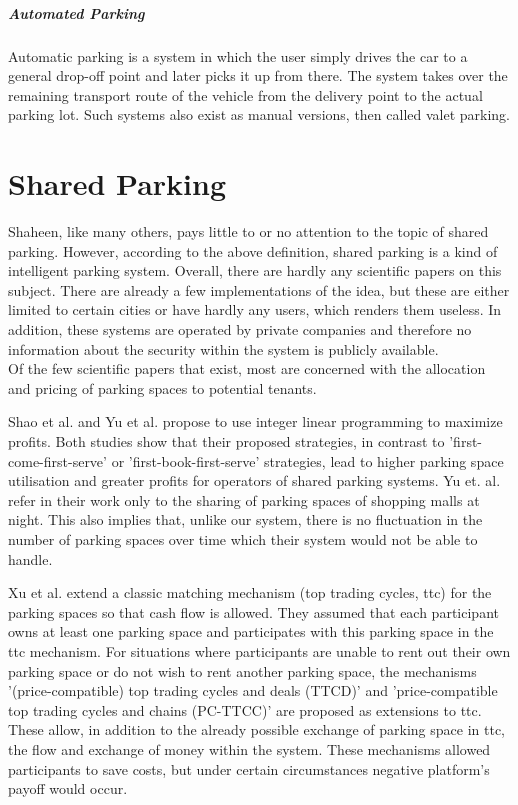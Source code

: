 \subparagraph{Automated Parking}
Automatic parking is a system in which the user simply drives the car to a general drop-off point and later picks it up from there. The system takes over the remaining transport route of the vehicle from the delivery point to the actual parking lot. Such systems also exist as manual versions, then called valet parking.

\section{Shared Parking}
Shaheen, like many others, pays little to or no attention to the topic of shared parking. However, according to the above definition, shared parking is a kind of intelligent parking system. Overall, there are hardly any scientific papers on this subject. There are already a few implementations of the idea, but these are either limited to certain cities or have hardly any users, which renders them useless. In addition, these systems are operated by private companies and therefore no information about the security within the system is publicly available.\\

Of the few scientific papers that exist, most are concerned with the allocation and pricing of parking spaces to potential tenants.

Shao et al. \cite{shao2016simple} and Yu et al. \cite{yu2018optimal} propose to use integer linear programming to maximize profits. Both studies show that their proposed strategies, in contrast to 'first-come-first-serve' or 'first-book-first-serve' strategies, lead to higher parking space utilisation and greater profits for operators of shared parking systems. Yu et. al. refer in their work only to the sharing of parking spaces of shopping malls at night. This also implies that, unlike our system, there is no fluctuation in the number of parking spaces over time which their system would not be able to handle.

Xu et al. \cite{xu2016private} extend a classic matching mechanism (top trading cycles, ttc) for the parking spaces so that cash flow is allowed. They assumed that each participant owns at least one parking space and participates with this parking space in the ttc mechanism. For situations where participants are unable to rent out their own parking space or do not wish to rent another parking space, the mechanisms '(price-compatible) top trading cycles and deals (TTCD)' and 'price-compatible top trading cycles and chains (PC-TTCC)' are proposed as extensions to ttc. These allow, in addition to the already possible exchange of parking space in ttc, the flow and exchange of money within the system. These mechanisms allowed participants to save costs, but under certain circumstances negative platform's payoff would occur. 

